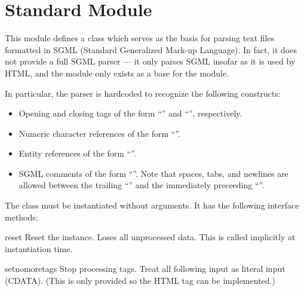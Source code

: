 \section{Standard Module }

This module defines a class  which serves as the
basis for parsing text files formatted in SGML (Standard Generalized
Mark-up Language).  In fact, it does not provide a full SGML parser
--- it only parses SGML insofar as it is used by HTML, and the module
only exists as a base for the  module.

In particular, the parser is hardcoded to recognize the following
constructs:

\begin{itemize}

\item
Opening and closing tags of the form
``'' and
``'', respectively.

\item
Numeric character references of the form ``''.

\item
Entity references of the form ``''.

\item
SGML comments of the form ``''.  Note that
spaces, tabs, and newlines are allowed between the trailing
``\code{>}'' and the immediately preceeding ``\code{--}''.

\end{itemize}

The  class must be instantiated without arguments.
It has the following interface methods:

\renewcommand{\indexsubitem}{({\tt SGMLParser} method)}

\begin{funcdesc}{reset}{}
Reset the instance.  Loses all unprocessed data.  This is called
implicitly at instantiation time.
\end{funcdesc}

\begin{funcdesc}{setnomoretags}{}
Stop processing tags.  Treat all following input as literal input
(CDATA).  (This is only provided so the HTML tag 
can be implemented.)
\end{funcdesc}


